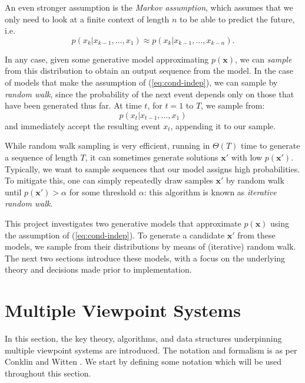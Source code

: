 \documentclass[12pt,a4paper,twoside,openright]{report}
\newcommand{\vect}[1]{\boldsymbol{\mathbf{#1}}}
\begin{document}
An even stronger assumption is the \emph{Markov assumption}, which assumes that
we only need to look at a finite context of length $n$ to be able to predict the
future, i.e.
\begin{equation}
  p(x_k | x_{k-1}, \ldots, x_1) \approx p(x_k | x_{k-1}, \ldots, x_{k-n}). 
\end{equation} 

In any case, given some generative model approximating $p(\vect{x})$, we can
\emph{sample} from this distribution to obtain an output sequence from the
model. In the case of models that make the assumption of (\ref{eq:cond-indep}),
we can sample by \emph{random walk}, since the probability of the next event
depends only on those that have been generated thus far. At time $t$, for $t =
1$ to $T$, we sample from:
$$ p(x_t | x_{t-1}, \ldots, x_1) $$
and immediately accept the resulting event $x_t$, appending it to our sample.

While random walk sampling is very efficient, running in $\Theta(T)$ time to
generate a sequence of length $T$, it can sometimes generate solutions
$\vect{x}'$ with low $p(\vect{x}')$. Typically, we want to sample sequences that
our model assigns high probabilities. To mitigate this, one can simply
repeatedly draw samples $\vect{x}'$ by random walk until $p(\vect{x}') > \alpha$
for some threshold $\alpha$: this algorithm is known as \emph{iterative random
walk}.

This project investigates two generative models that approximate $p(\vect{x})$
using the assumption of (\ref{eq:cond-indep}). To generate a candidate
$\vect{x}'$ from these models, we sample from their distributions by means of
(iterative) random walk. The next two sections introduce these models, with a
focus on the underlying theory and decisions made prior to implementation.

\section{Multiple Viewpoint Systems}

In this section, the key theory, algorithms, and data structures underpinning
multiple viewpoint systems are introduced. The notation and formalism is as per
Conklin and Witten \cite{conklin1995viewpoints}. We start by defining some
notation which will be used throughout this section.
\end{document}
